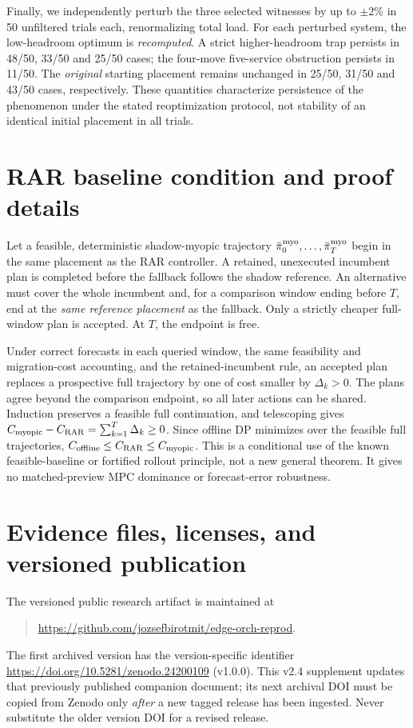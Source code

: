 \documentclass[10pt,a4paper]{article}
\begin{document}
Finally, we independently perturb the three selected witnesses by up to $\pm2\%$ in 50 unfiltered trials each, renormalizing total load. For each perturbed system, the low-headroom optimum is \emph{recomputed}. A strict higher-headroom trap persists in 48/50, 33/50 and 25/50 cases; the four-move five-service obstruction persists in 11/50. The \emph{original} starting placement remains unchanged in 25/50, 31/50 and 43/50 cases, respectively. These quantities characterize persistence of the phenomenon under the stated reoptimization protocol, not stability of an identical initial placement in all trials.

\section{RAR baseline condition and proof details}\label{sec:rar}
Let a feasible, deterministic shadow-myopic trajectory $\bar\pi_0^{\rm myo},\ldots,\bar\pi_T^{\rm myo}$ begin in the same placement as the RAR controller. A retained, unexecuted incumbent plan is completed before the fallback follows the shadow reference. An alternative must cover the whole incumbent and, for a comparison window ending before $T$, end at the \emph{same reference placement} as the fallback. Only a strictly cheaper full-window plan is accepted. At $T$, the endpoint is free.

Under correct forecasts in each queried window, the same feasibility and migration-cost accounting, and the retained-incumbent rule, an accepted plan replaces a prospective full trajectory by one of cost smaller by $\Delta_k>0$. The plans agree beyond the comparison endpoint, so all later actions can be shared. Induction preserves a feasible full continuation, and telescoping gives $C_{\rm myopic}-C_{\rm RAR}=\sum_{k=1}^T\Delta_k\ge0$. Since offline DP minimizes over the feasible full trajectories, $C_{\rm offline}\le C_{\rm RAR}\le C_{\rm myopic}$. This is a conditional use of the known feasible-baseline or fortified rollout principle, not a new general theorem. It gives no matched-preview MPC dominance or forecast-error robustness.

\section{Evidence files, licenses, and versioned publication}\label{sec:files}
The versioned public research artifact is maintained at
\begin{quote}\small\url{https://github.com/jozsefbirotmit/edge-orch-reprod}.\end{quote}
The first archived version has the version-specific identifier \url{https://doi.org/10.5281/zenodo.24200109} (v1.0.0). This v2.4 supplement updates that previously published companion document; its next archival DOI must be copied from Zenodo only \emph{after} a new tagged release has been ingested. Never substitute the older version DOI for a revised release.
\end{document}
